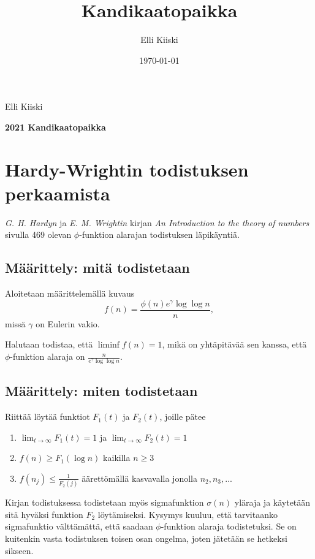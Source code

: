 \documentclass{article}
\title{Kandikaatopaikka}
\author{Elli Kiiski}
\date{\today}
\theoremstyle{definition}
\begin{document}
{\large
Elli Kiiski
\par
\textbf{2021 Kandikaatopaikka}
}
\vspace{0.5cm}

\section{Hardy-Wrightin todistuksen perkaamista}

\textit{G. H. Hardyn} ja \textit{E. M. Wrightin} kirjan \textit{An Introduction to the theory of numbers} sivulla 469 olevan $\phi$-funktion alarajan todistuksen läpikäyntiä.

\subsection{Määrittely: mitä todistetaan}

Aloitetaan määrittelemällä kuvaus
\begin{equation*}
    f(n)= \frac{\phi(n)e^\gamma \log\log n}{n},
\end{equation*}
missä $\gamma$ on Eulerin vakio.


Halutaan todistaa, että $\liminf f(n)=1$, mikä on yhtäpitävää sen kanssa, että $\phi$-funktion alaraja on $\frac{n}{e^\gamma \log\log n}$.

\subsection{Määrittely: miten todistetaan}

Riittää löytää funktiot $F_1(t)$ ja $F_2(t)$, joille pätee
\begin{enumerate}
\label{ehdot}
    \item $\lim_{t\rightarrow \infty} F_1(t) = 1$ ja $\lim_{t\rightarrow \infty} F_2(t) = 1$
    \item $f(n) \geq F_1(\log n)$ kaikilla $n\geq 3$
    \item $f(n_j) \leq \frac{1}{F_2(j)}$ äärettömällä kasvavalla jonolla $n_2, n_3,...$
\end{enumerate}


Kirjan todistuksessa todistetaan myös sigmafunktion $\sigma(n)$ yläraja ja käytetään sitä hyväksi funktion $F_2$ löytämiseksi. Kysymys kuuluu, että tarvitaanko sigmafunktio välttämättä, että saadaan $\phi$-funktion alaraja todistetuksi. Se on kuitenkin vasta todistuksen toisen osan ongelma, joten jätetään se hetkeksi sikseen.
\end{document}
